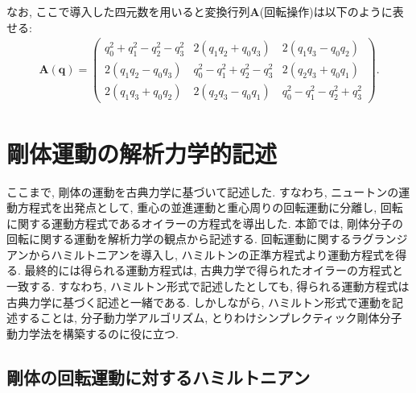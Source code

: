 なお, ここで導入した四元数を用いると変換行列$\bm{A}$(回転操作)は以下のように表せる:
\begin{align}
  \bm{A(\bm{q})} =
 \begin{pmatrix}
  q_0^2 + q_1^2 - q_2^2 - q_3^2 & 2(q_1q_2 + q_0q_3)            & 2(q_1q_3 - q_0q_2) \\
  2(q_1q_2 - q_0q_3)            & q_0^2 - q_1^2 + q_2^2 - q_3^2 & 2(q_2q_3 + q_0q_1) \\
  2(q_1q_3 + q_0q_2)            & 2(q_2q_3 - q_0q_1)            & q_0^2 - q_1^2 - q_2^2 + q_3^2 
 \end{pmatrix}.
\end{align}


\section{剛体運動の解析力学的記述}

ここまで, 剛体の運動を古典力学に基づいて記述した.
すなわち, ニュートンの運動方程式を出発点として, 重心の並進運動と重心周りの回転運動に分離し,
回転に関する運動方程式であるオイラーの方程式を導出した.
本節では, 剛体分子の回転に関する運動を解析力学の観点から記述する.
回転運動に関するラグランジアンからハミルトニアンを導入し, ハミルトンの正準方程式より運動方程式を得る.
最終的には得られる運動方程式は, 古典力学で得られたオイラーの方程式と一致する. 
すなわち, ハミルトン形式で記述したとしても, 得られる運動方程式は古典力学に基づく記述と一緒である. しかしながら, ハミルトン形式で運動を記述することは, 分子動力学アルゴリズム, とりわけシンプレクティック剛体分子動力学法を構築するのに役に立つ.


\subsection{剛体の回転運動に対するハミルトニアン}
